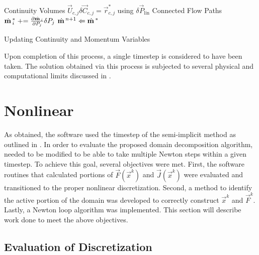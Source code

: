 \begin{algo}[ht!]
\setlength{\baselineskip}{0.625\baselineskip}
\begin{algorithmic}[1]
\Loop \; Continuity Volumes
	\Solve $\vec{U}_{c, j} \delta \vec{C}_{c, j} = \vec{r}^{*}_{c, j}$ using $\delta\vec{P}_{\text{lin}}$		
	\Loop \; Connected Flow Paths
		\Set $\momVec{}^{*}_{i} \pluseq  \frac{\partial \momVec{}_{i}}{\partial P_{j}} \delta P_{j}$
	\EndLoop
\EndLoop
\Set $\momVec{}^{n+1} \Leftarrow \momVec{}^{*}$
\end{algorithmic}
\caption{Updating Continuity and Momentum Variables}
\label{alg:updateVariables}
\end{algo}

Upon completion of this process, a single timestep is considered to have been taken.
The solution obtained via this process is subjected to several physical and computational limits discussed in .

\section{Nonlinear \cobra{}}
\label{sect:nlnCobraSolver}
As obtained, the \cobra{} software used the timestep of the semi-implicit method as outlined in .
In order to evaluate the proposed domain decomposition algorithm, \cobra{} needed to be modified to be able to take multiple Newton steps within a given timestep.
To achieve this goal, several objectives were met.
First, the software routines that calculated portions of $\vec{F}(\vec{x}^{k})$ and $\vec{J}(\vec{x}^{k})$ were evaluated and transitioned to the proper nonlinear discretization.
Second, a method to identify the active portion of the domain was developed to correctly construct $\vec{x}^{k}$ and $\vec{F}^{k}$.
Lastly, a Newton loop algorithm was implemented.
This section will describe work done to meet the above objectives.

\subsection{Evaluation of Discretization}
\label{subsect:nonlinearDiscretization}

